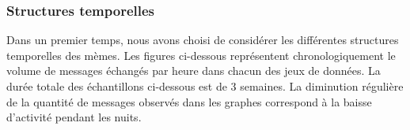\subsubsection[Structures temporelles]{Structures temporelles}
Dans un premier temps, nous avons choisi de consid\'erer les diff\'erentes structures temporelles des m\`emes. Les figures ci-dessous repr\'esentent chronologiquement le volume de messages \'echang\'es par heure dans chacun des jeux de donn\'ees. La dur\'ee totale des \'echantillons ci-dessous est de 3 semaines. La diminution r\'eguli\`ere de la quantit\'e de messages observ\'es dans les graphes correspond \`a la baisse d{\textquoteright}activit\'e pendant les nuits. 

\begin{figure}[ht]
    \centering
    \newline
    \newline
\end{figure}

